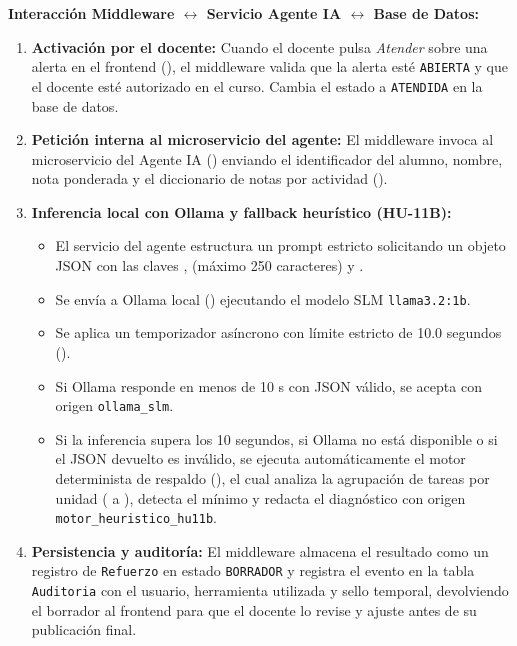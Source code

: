 \documentclass[11pt,a4paper]{article}
\begin{document}
\textbf{Interacción Middleware $\leftrightarrow$ Servicio Agente IA $\leftrightarrow$ Base de Datos:}
\begin{enumerate}
  \item \textbf{Activación por el docente:} Cuando el docente pulsa \emph{Atender} sobre una alerta en el frontend (), el middleware valida que la alerta esté \texttt{ABIERTA} y que el docente esté autorizado en el curso. Cambia el estado a \texttt{ATENDIDA} en la base de datos.
  \item \textbf{Petición interna al microservicio del agente:} El middleware invoca al microservicio del Agente IA () enviando el identificador del alumno, nombre, nota ponderada y el diccionario de notas por actividad ().
  \item \textbf{Inferencia local con Ollama y fallback heurístico (HU-11B):}
  \begin{itemize}
    \item El servicio del agente estructura un prompt estricto solicitando un objeto JSON con las claves ,  (máximo 250 caracteres) y .
    \item Se envía a Ollama local () ejecutando el modelo SLM \texttt{llama3.2:1b}.
    \item Se aplica un temporizador asíncrono con límite estricto de 10.0 segundos ().
    \item Si Ollama responde en menos de 10 s con JSON válido, se acepta con origen \texttt{ollama_slm}.
    \item Si la inferencia supera los 10 segundos, si Ollama no está disponible o si el JSON devuelto es inválido, se ejecuta automáticamente el motor determinista de respaldo (), el cual analiza la agrupación de tareas por unidad ( a ), detecta el mínimo y redacta el diagnóstico con origen \texttt{motor_heuristico_hu11b}.
  \end{itemize}
  \item \textbf{Persistencia y auditoría:} El middleware almacena el resultado como un registro de \texttt{Refuerzo} en estado \texttt{BORRADOR} y registra el evento en la tabla \texttt{Auditoria} con el usuario, herramienta utilizada y sello temporal, devolviendo el borrador al frontend para que el docente lo revise y ajuste antes de su publicación final.
\end{enumerate}
\end{document}
